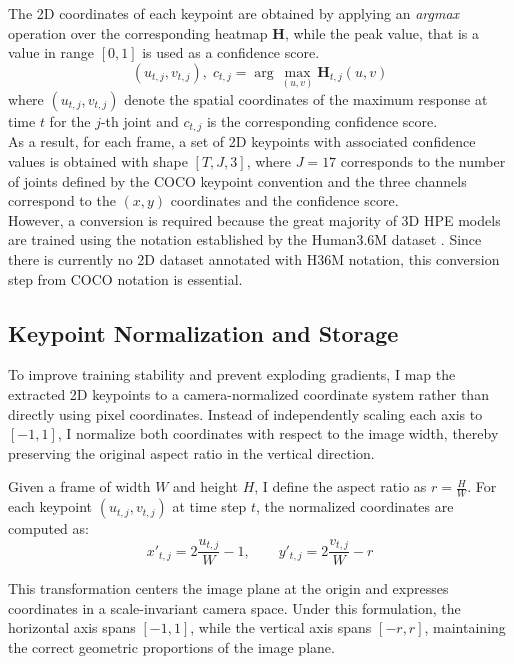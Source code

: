 The 2D coordinates of each keypoint are obtained by applying an \textit{argmax} operation over the corresponding heatmap $\mathbf{H}$, while the peak value, that is a value in range $[0,1]$ is used as a confidence score.
\begin{equation}
    (u_{t,j}, v_{t,j}), \; c_{t,j} = \arg\max_{(u,v)} \mathbf{H}_{t,j}(u,v)
\end{equation}
where $(u_{t,j}, v_{t,j})$ denote the spatial coordinates of the maximum response at time $t$ for the $j$-th joint and $c_{t,j}$ is the corresponding confidence score.\\
As a result, for each frame, a set of 2D keypoints with associated confidence values is obtained with shape $[T, J, 3]$, where $J = 17$ corresponds to the number of joints defined by the 
COCO keypoint convention and the three channels correspond to the $(x, y)$ coordinates and the confidence score.\\
However, a conversion is required because the great majority of 3D HPE models are trained using the notation established by the Human3.6M dataset \cite{ionescu2013human3}. Since there is currently no 2D dataset annotated with H36M notation, this 
conversion step from COCO notation is essential.

\subsection{Keypoint Normalization and Storage}
To improve training stability and prevent exploding gradients, I map the extracted 2D keypoints to a camera-normalized coordinate system rather than directly using pixel coordinates. Instead of independently
scaling each axis to $[-1,1]$, I normalize both coordinates with respect to the image width, thereby preserving the original aspect ratio in the vertical direction.

Given a frame of width $W$ and height $H$, I define the aspect ratio as $r = \frac{H}{W}$. For each keypoint $(u_{t,j}, v_{t,j})$ at time step $t$, the normalized coordinates are computed as:
\begin{equation}
    x'_{t,j} = 2\frac{u_{t,j}}{W} - 1,
    \qquad
    y'_{t,j} = 2\frac{v_{t,j}}{W} - r
\end{equation}

This transformation centers the image plane at the origin and expresses coordinates in a scale-invariant camera space. Under this formulation, the horizontal axis spans $[-1,1]$, while the vertical axis 
spans $[-r,r]$, maintaining the correct geometric proportions of the image plane.

